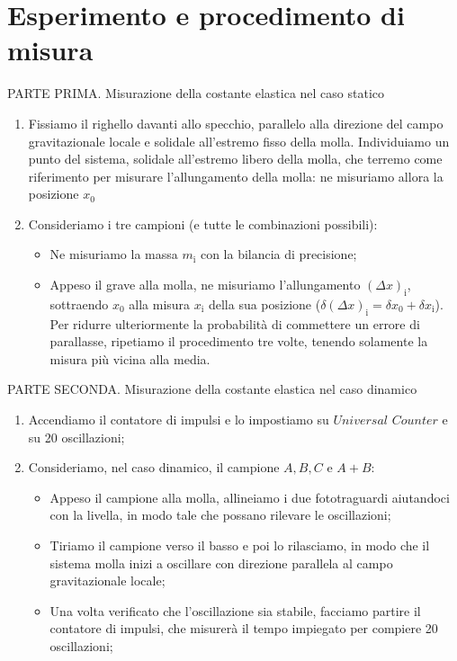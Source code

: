 \documentclass{article}
\begin{document}
\section{Esperimento e procedimento di misura}
PARTE PRIMA. Misurazione della costante elastica nel caso statico
\begin{enumerate}
    \item Fissiamo il righello davanti allo specchio, parallelo alla direzione del campo gravitazionale locale e solidale all’estremo fisso della molla. Individuiamo un punto del sistema, solidale all’estremo libero della molla, che terremo come riferimento per misurare l’allungamento della molla: ne misuriamo allora la posizione $x_\text{0}$
    \item Consideriamo i tre campioni (e tutte le combinazioni possibili):
    \begin{itemize}
        \item Ne misuriamo la massa $m_\text{i}$ con la bilancia di precisione;
        \item Appeso il grave alla molla, ne misuriamo l'allungamento $(\Delta x)_\text{i}$, sottraendo $x_\text{0}$ alla misura $x_\text{i}$ della sua posizione ($\delta (\Delta x)_\text{i} = \delta  x_\text{0} + \delta  x_\text{i}$). Per ridurre ulteriormente la probabilità di commettere un errore di parallasse, ripetiamo il procedimento tre volte, tenendo solamente la misura più vicina alla media. 
    \end{itemize}
\end{enumerate}
PARTE SECONDA. Misurazione della costante elastica nel caso dinamico
\begin{enumerate}
    \item Accendiamo il contatore di impulsi e lo impostiamo su $Universal$ $Counter$ e su 20 oscillazioni; 
    \item Consideriamo, nel caso dinamico, il campione $A, B, C$ e $A+B$:
    \begin{itemize}
        \item Appeso il campione alla molla, allineiamo i due fototraguardi aiutandoci con la livella, in modo tale che possano rilevare le oscillazioni; 
        \item Tiriamo il campione verso il basso e poi lo rilasciamo, in modo che il sistema molla inizi a oscillare con direzione parallela al campo gravitazionale locale; 
        \item Una volta verificato che l’oscillazione sia stabile, facciamo partire il contatore di impulsi, che misurerà il tempo impiegato per compiere 20 oscillazioni;
    \end{itemize}
\end{enumerate}
\end{document}
